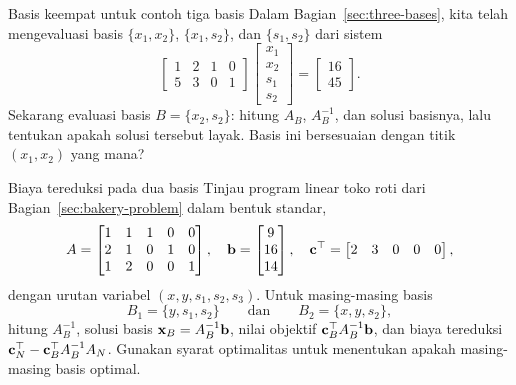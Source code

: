 \begin{ex}{Basis keempat untuk contoh tiga basis}{}
\label{ex:matrix-fourth-basis}
 Dalam Bagian~\ref{sec:three-bases}, kita telah mengevaluasi basis \( \{x_1, x_2\} \), \( \{x_1, s_2\} \), dan \( \{s_1, s_2\} \) dari sistem
\[
\begin{bmatrix}
    1 & 2 & 1 & 0 \\
    5 & 3 & 0 & 1
\end{bmatrix}
\begin{bmatrix}
    x_1 \\ x_2 \\ s_1 \\ s_2
\end{bmatrix}
=
\begin{bmatrix}
    16 \\ 45
\end{bmatrix}.
\]
Sekarang evaluasi basis \( B = \{x_2, s_2\} \): hitung \( A_B \), \( A_B^{-1} \), dan solusi basisnya, lalu tentukan apakah solusi tersebut layak.  Basis ini bersesuaian dengan titik \( (x_1, x_2) \) yang mana?
\exrefs{\S\ref{sec:three-bases}}
\end{ex}


\begin{ex}{Biaya tereduksi pada dua basis}{}
\label{ex:matrix-reduced-costs}
 Tinjau program linear toko roti dari Bagian~\ref{sec:bakery-problem} dalam bentuk standar,
\[
A =
\begin{bmatrix}
1 & 1 & 1 & 0 & 0 \\
2 & 1 & 0 & 1 & 0 \\
1 & 2 & 0 & 0 & 1
\end{bmatrix},
\quad
\mathbf{b} = \begin{bmatrix} 9 \\ 16 \\ 14 \end{bmatrix},
\quad
\mathbf{c}^\top = \begin{bmatrix} 2 & 3 & 0 & 0 & 0 \end{bmatrix},
\]
dengan urutan variabel \( (x, y, s_1, s_2, s_3) \).  Untuk masing-masing basis
\[
B_1 = \{y, s_1, s_2\}
\qquad \text{dan} \qquad
B_2 = \{x, y, s_2\},
\]
hitung \( A_B^{-1} \), solusi basis \( \mathbf{x}_B = A_B^{-1}\mathbf{b} \), nilai objektif \( \mathbf{c}_B^\top A_B^{-1} \mathbf{b} \), dan biaya tereduksi \( \mathbf{c}_N^\top - \mathbf{c}_B^\top A_B^{-1} A_N \).  Gunakan syarat optimalitas untuk menentukan apakah masing-masing basis optimal.
\exrefs{\S\ref{sec:optimality-conditions}, \S\ref{sec:bakery-problem}}
\end{ex}

